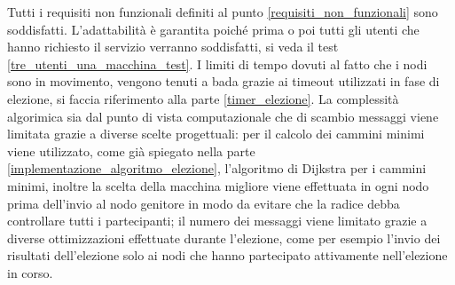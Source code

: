 Tutti i requisiti non funzionali definiti al punto \ref{requisiti_non_funzionali} sono soddisfatti. L'adattabilità è garantita poiché prima o poi tutti gli utenti che hanno richiesto il servizio verranno soddisfatti, si veda il test \ref{tre_utenti_una_macchina_test}. I limiti di tempo dovuti al fatto che i nodi sono in movimento, vengono tenuti a bada grazie ai timeout utilizzati in fase di elezione, si faccia riferimento alla parte \ref{timer_elezione}. La complessità algorimica sia dal punto di vista computazionale che di scambio messaggi viene limitata grazie a diverse scelte progettuali: per il calcolo dei cammini minimi viene utilizzato, come già spiegato nella parte \ref{implementazione_algoritmo_elezione}, l'algoritmo di Dijkstra per i cammini minimi, inoltre la scelta della macchina migliore viene effettuata in ogni nodo prima dell'invio al nodo genitore in modo da evitare che la radice debba controllare tutti i partecipanti; il numero dei messaggi viene limitato grazie a diverse ottimizzazioni effettuate durante l'elezione, come per esempio l'invio dei risultati dell'elezione solo ai nodi che hanno partecipato attivamente nell'elezione in corso. 

